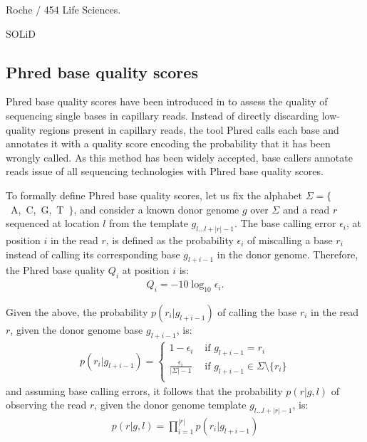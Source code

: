 Roche / 454 Life Sciences.

SOLiD

\subsection{Phred base quality scores}
\label{sec:background:hts:phred}

Phred base quality scores have been introduced in \citep{Ewing1998, Ewing1998a} to assess the quality of sequencing single bases in capillary reads.
Instead of directly discarding low-quality regions present in capillary reads, the tool Phred calls each base and annotates it with a quality score encoding the probability that it has been wrongly called.
As this method has been widely accepted, base callers annotate reads issue of all sequencing technologies with Phred base quality scores.

To formally define Phred base quality scores, let us fix the alphabet $\Sigma = \{$~A,~C,~G,~T~$\}$, and consider a known donor genome $g$ over $\Sigma$ and a read $r$ sequenced at location $l$ from the template $g_{l \dots l+|r|-1}$.
The base calling error $\epsilon_i$, at position $i$ in the read $r$, is defined as the probability $\epsilon_i$ of miscalling a base $r_i$ instead of calling its corresponding base $g_{l+i-1}$ in the donor genome.
Therefore, the Phred base quality $Q_i$ at position $i$ is:
\begin{eqnarray}
Q_i = -10 \log_{10} \epsilon_i.
\end{eqnarray}

Given the above, the probability $p(r_i | g_{l+i-1})$ of calling the base $r_i$ in the read $r$, given the donor genome base $g_{l+i-1}$, is:
\begin{eqnarray}
p(r_i | g_{l+i-1}) = \left\{
\begin{array}{ll}
1-\epsilon_i                  & \text{ if } g_{l+i-1} = r_i\\
\frac{\epsilon_i}{|\Sigma|-1} & \text{ if } g_{l+i-1} \in \Sigma \setminus \{r_i\}\\
\end{array}
\right.
\end{eqnarray}
and assuming \iid base calling errors, it follows that the probability $p(r | g, l)$ of observing the read $r$, given the donor genome template $g_{l \dots l+|r|-1}$, is:
\begin{eqnarray}
\label{eq:phred}
p(r | g, l) = \prod_{i=1}^{|r|}{p(r_i | g_{l+i-1})}
\end{eqnarray}

